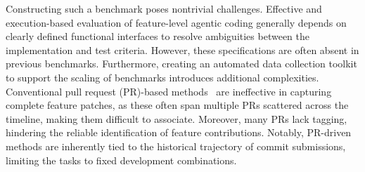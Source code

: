 \documentclass{article}
\begin{document}
Constructing such a benchmark poses nontrivial challenges. Effective and execution-based evaluation of feature-level agentic coding generally depends on clearly defined functional interfaces to resolve ambiguities between the implementation and test criteria. However, these specifications are often absent in previous benchmarks. Furthermore, creating an automated data collection toolkit to support the scaling of benchmarks introduces additional complexities. Conventional pull request (PR)-based methods~\citep{jimenez2024swebench,swegym2025icml,r2egym2025colm} are ineffective in capturing complete feature patches, as these often span multiple PRs scattered across the timeline, making them difficult to associate. Moreover, many PRs lack tagging, hindering the reliable identification of feature contributions. Notably, PR-driven methods are inherently tied to the historical trajectory of commit submissions, limiting the tasks to fixed development combinations.
\end{document}
